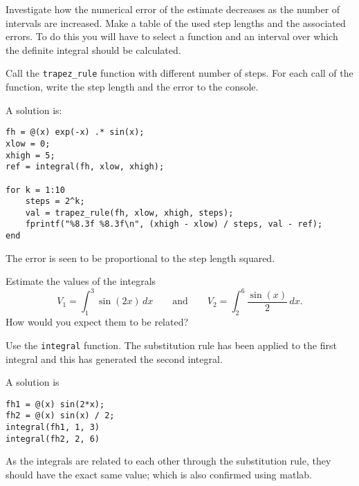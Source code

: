 \begin{ex}
Investigate how the numerical error of the estimate decreases 
as the number of intervals are increased.
Make a table of the used step lengths and the 
associated errors.
To do this you will have to select a function and an 
interval over which the definite integral should be
calculated.
\begin{hint}
Call the \verb!trapez_rule! function with different 
number of steps.
For each call of the function, write the step length
and the error to the console.
\end{hint}
\begin{sol}
A solution is: 
\begin{lstlisting}
fh = @(x) exp(-x) .* sin(x);
xlow = 0;
xhigh = 5;
ref = integral(fh, xlow, xhigh);

for k = 1:10
    steps = 2^k;
    val = trapez_rule(fh, xlow, xhigh, steps);
    fprintf("%8.3f %8.3f\n", (xhigh - xlow) / steps, val - ref);
end
\end{lstlisting}
The error is seen to be proportional to the step length
squared.
\end{sol}
\end{ex}


\begin{ex}
Estimate the values of the integrals
\[
V_1 = \int_1^3 \sin(2x) \, dx \qquad \textrm{and} \qquad
V_2 = \int_2^6 \frac{\sin(x)}{2} \, dx.
\]
How would you expect them to be related?
\begin{hint}
Use the \verb!integral! function.
The substitution rule has been applied to the first
integral and this has generated the second integral.
\end{hint}
\begin{sol}
A solution is
\begin{lstlisting}
fh1 = @(x) sin(2*x);
fh2 = @(x) sin(x) / 2;
integral(fh1, 1, 3)
integral(fh2, 2, 6)
\end{lstlisting}

As the integrals are related to each other 
through the substitution rule, they should have 
the exact same value; which is also confirmed 
using matlab.
\end{sol}
\end{ex}



 